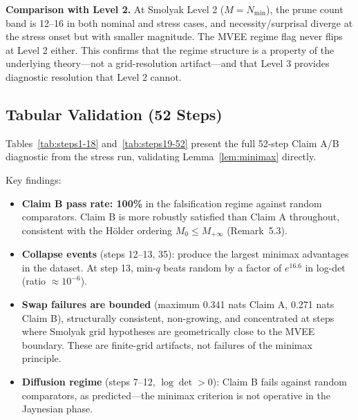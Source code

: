 \documentclass[12pt]{article}
\begin{document}
\textbf{Comparison with Level 2.} At Smolyak Level 2 ($M = N_{\min}$), the prune count band is 12--16 in both nominal and stress cases, and necessity/surprisal diverge at the stress onset but with smaller magnitude. The MVEE regime flag never flips at Level 2 either. This confirms that the regime structure is a property of the underlying theory---not a grid-resolution artifact---and that Level 3 provides diagnostic resolution that Level 2 cannot.

\subsection{Tabular Validation (52 Steps)}

Tables~\ref{tab:steps1-18} and~\ref{tab:steps19-52} present the full 52-step Claim A/B diagnostic from the stress run, validating Lemma~\ref{lem:minimax} directly.

Key findings:
\begin{itemize}
\item \textbf{Claim B pass rate: 100\%} in the falsification regime against random comparators. Claim B is more robustly satisfied than Claim A throughout, consistent with the H\"{o}lder ordering $M_0 \leq M_{+\infty}$ (Remark~5.3).
\item \textbf{Collapse events} (steps 12--13, 35): produce the largest minimax advantages in the dataset. At step 13, min-$q$ beats random by a factor of $e^{16.6}$ in log-det (ratio $\approx 10^{-6}$).
\item \textbf{Swap failures are bounded} (maximum 0.341 nats Claim A, 0.271 nats Claim B), structurally consistent, non-growing, and concentrated at steps where Smolyak grid hypotheses are geometrically close to the MVEE boundary. These are finite-grid artifacts, not failures of the minimax principle.
\item \textbf{Diffusion regime} (steps 7--12, $\log\det > 0$): Claim B fails against random comparators, as predicted---the minimax criterion is not operative in the Jaynesian phase.
\end{itemize}
\end{document}
